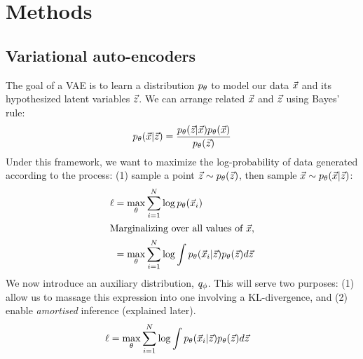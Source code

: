 \section{Methods}

\subsection{Variational auto-encoders}

The goal of a VAE is to learn a distribution $p_\theta$ to model our data $\vec{x}$ and its hypothesized latent variables $\vec{z}$. We can arrange related $\vec{x}$ and $\vec{z}$ using Bayes' rule:
\begin{equation*}
    p_\theta(\vec{x}|\vec{z}) = \frac{p_\theta(\vec{z}|\vec{x})p_\theta(\vec{x})}{p_\theta(\vec{z})}
\end{equation*}
Under this framework, we want to maximize the log-probability of data generated according to the process: (1) sample a point $\vec{z}\sim p_\theta(\vec{z})$, then sample $\vec{x}\sim p_\theta(\vec{x}|\vec{z})$:
\begin{align*}
    \ell &= \max_\theta\sum_{i=1}^N\log p_\theta(\vec{x}_i) \\
    \intertext{Marginalizing over all values of $\vec{x}$,}
    &= \max_\theta\sum_{i=1}^N\log\int p_\theta(\vec{x}_i|\vec{z})p_\theta(\vec{z})d\vec{z}
\end{align*}
We now introduce an auxiliary distribution, $q_\phi$. This will serve two purposes: (1) allow us to massage this expression into one involving a KL-divergence, and (2) enable {\it amortised} inference (explained later).
\begin{align*}
    \ell &= \max_\theta\sum_{i=1}^N\log\int p_\theta(\vec{x}_i|\vec{z})p_\theta(\vec{z})d\vec{z}
\end{align*}